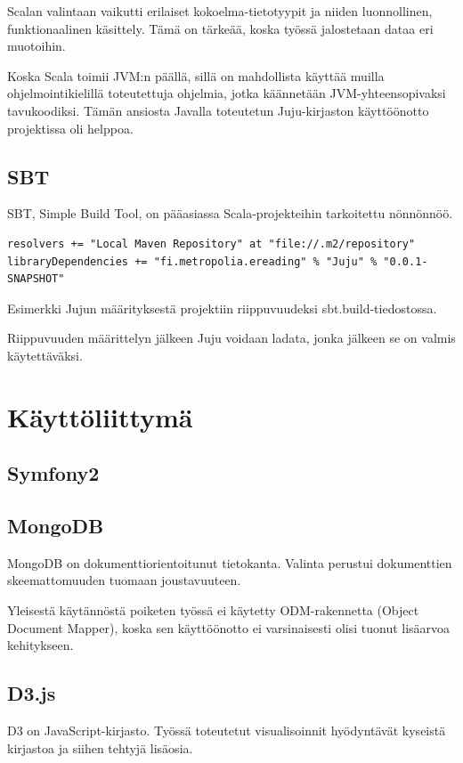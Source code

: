 \documentclass[11pt,a4paper,oneside]{memoir}
\begin{document}
Scalan valintaan vaikutti erilaiset kokoelma-tietotyypit ja niiden luonnollinen, funktionaalinen käsittely. Tämä on tärkeää, koska työssä jalostetaan dataa eri muotoihin.

Koska Scala toimii JVM:n päällä, sillä on mahdollista käyttää muilla ohjelmointikielillä toteutettuja ohjelmia, jotka käännetään JVM-yhteensopivaksi tavukoodiksi. Tämän ansiosta Javalla toteutetun Juju-kirjaston käyttöönotto projektissa oli helppoa.

\subsection{SBT}
SBT, Simple Build Tool, on pääasiassa Scala-projekteihin tarkoitettu nönnönnöö.

\begin{program}
  \begin{verbatim}
resolvers += "Local Maven Repository" at "file://.m2/repository"
libraryDependencies += "fi.metropolia.ereading" % "Juju" % "0.0.1-SNAPSHOT"
  \end{verbatim}
  \caption{Esimerkki Jujun määrityksestä projektiin riippuvuudeksi sbt.build-tiedostossa.}
\end{program}

Riippuvuuden määrittelyn jälkeen Juju voidaan ladata, jonka jälkeen se on valmis käytettäväksi.

\section{Käyttöliittymä}

\subsection{Symfony2}

\subsection{MongoDB}
MongoDB on dokumenttiorientoitunut tietokanta. Valinta perustui dokumenttien skeemattomuuden tuomaan joustavuuteen.

Yleisestä käytännöstä poiketen työssä ei käytetty ODM-rakennetta (Object Document Mapper), koska sen käyttöönotto ei varsinaisesti olisi tuonut lisäarvoa kehitykseen. 

\subsection{D3.js}
D3 on JavaScript-kirjasto. Työssä toteutetut visualisoinnit hyödyntävät kyseistä kirjastoa ja siihen tehtyjä lisäosia.
\end{document}
